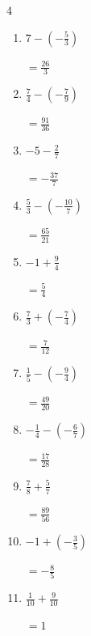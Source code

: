 \begin{multicols}{4}
\begin{enumerate}
        $\displaystyle =-\frac{4}{3}$

  \item $\displaystyle 7 - \left(-\frac{5}{3}\right)$

        $\displaystyle =\frac{26}{3}$

\columnbreak %

\resetques

  \item $\displaystyle \frac{7}{4} - \left(-\frac{7}{9}\right)$

        $\displaystyle =\frac{91}{36}$

  \item $\displaystyle -5 - \frac{2}{7}$

        $\displaystyle =-\frac{37}{7}$

  \item $\displaystyle \frac{5}{3} - \left(-\frac{10}{7}\right)$

        $\displaystyle =\frac{65}{21}$

  \item $\displaystyle -1 + \frac{9}{4}$

        $\displaystyle =\frac{5}{4}$

  \item $\displaystyle \frac{7}{3} + \left(-\frac{7}{4}\right)$

        $\displaystyle =\frac{7}{12}$

  \item $\displaystyle \frac{1}{5} - \left(-\frac{9}{4}\right)$

        $\displaystyle =\frac{49}{20}$

  \item $\displaystyle -\frac{1}{4} - \left(-\frac{6}{7}\right)$

        $\displaystyle =\frac{17}{28}$

  \item $\displaystyle \frac{7}{8} + \frac{5}{7}$

        $\displaystyle =\frac{89}{56}$

  \item $\displaystyle -1 + \left(-\frac{3}{5}\right)$

        $\displaystyle =-\frac{8}{5}$

  \item $\displaystyle \frac{1}{10} + \frac{9}{10}$

        $\displaystyle =1$

\columnbreak %


\end{enumerate}
\end{multicols}
